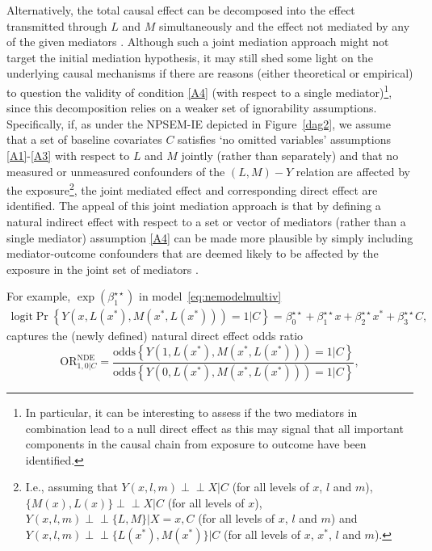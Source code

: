 \documentclass[nojss]{jss}
\newcommand{\cip}{\mbox{$\perp\!\!\!\perp$}}
\begin{document}
\par Alternatively, the total causal effect can be decomposed into the effect transmitted through $L$ and $M$ simultaneously and the effect not mediated by any of the given mediators \citep{VanderWeele2013b, VanderWeele2014}. Although such a joint mediation approach might not target the initial mediation hypothesis, it may still shed some light on the underlying causal mechanisms if there are reasons (either theoretical or empirical) to question the validity of condition \ref{A4} (with respect to a single mediator)\footnote{In particular, it can be interesting to assess if the two mediators in combination lead to a null direct effect as this may signal that all important components in the causal chain from exposure to outcome have been identified.}, since this decomposition relies on a weaker set of ignorability assumptions. Specifically, if, as under the NPSEM-IE depicted in Figure~\ref{dag2}, we assume that a set of baseline covariates $C$ satisfies `no omitted variables' assumptions \ref{A1}-\ref{A3} with respect to $L$ and $M$ jointly (rather than separately) and that no measured or unmeasured confounders of the $(L,M)-Y$ relation are affected by the exposure\footnote{I.e., assuming that $Y(x,l,m) \cip X \vert C$ (for all levels of $x$, $l$ and $m$), $\{M(x), L(x)\} \cip X \vert C$ (for all levels of $x$), $Y(x,l,m) \cip \{L,M\} \vert X=x,C$ (for all levels of $x$, $l$ and $m$) and $Y(x,l,m) \cip \{L(x^*),M(x^*)\} \vert C$ (for all levels of $x$, $x^*$, $l$ and $m$).}, the joint mediated effect and corresponding direct effect are identified. The appeal of this joint mediation approach is that by defining a natural indirect effect with respect to a set or vector of mediators (rather than a single mediator) assumption \ref{A4} can be made more plausible by simply including mediator-outcome confounders that are deemed likely to be affected by the exposure in the joint set of mediators \citep{VanderWeele2013b}.
\par For example, $\exp(\beta_1^{\star\star})$ in model~\eqref{eq:nemodelmultiv}
\begin{align}
\mbox{logit} \Pr\left\{Y(x,L(x^*),M(x^*, L(x^*)))=1|C\right\} = \beta_0^{\star\star} + \beta_1^{\star\star} x + \beta_2^{\star\star} x^* + \beta_3^{\star\star} C,
\label{eq:nemodelmultiv}
\end{align}
captures the (newly defined) natural direct effect odds ratio 
$$
\mbox{OR}^{\text{NDE}}_{1,0|C} = \frac{\mbox{odds}\left\{Y(1,L(x^*),M(x^*, L(x^*)))=1|C\right\}}{\mbox{odds}\left\{Y(0,L(x^*),M(x^*, L(x^*)))=1|C\right\}},
$$
\end{document}
